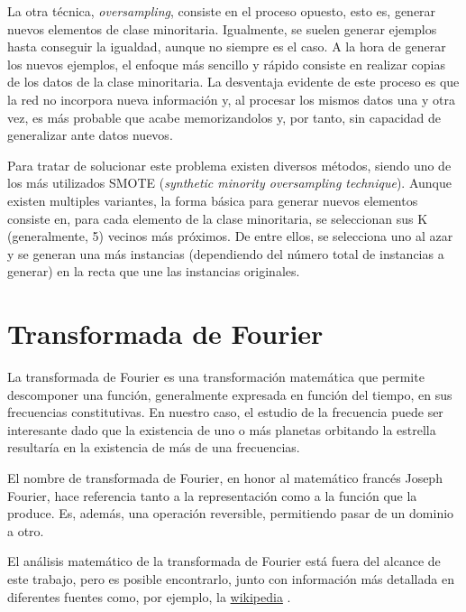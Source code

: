 La otra técnica, \textit{oversampling}, consiste en el proceso opuesto, esto es, generar nuevos elementos de clase minoritaria. Igualmente, se suelen generar ejemplos hasta conseguir la igualdad, aunque no siempre es el caso. A la hora de generar los nuevos ejemplos, el enfoque más sencillo y rápido consiste en realizar copias de los datos de la clase minoritaria. La desventaja evidente de este proceso es que la red no incorpora nueva información y, al procesar los mismos datos una y otra vez, es más probable que acabe memorizandolos y, por tanto, sin capacidad de generalizar ante datos nuevos.

Para tratar de solucionar este problema existen diversos métodos, siendo uno de los más utilizados SMOTE \cite{SMOTE} (\textit{synthetic minority oversampling technique}). Aunque existen multiples variantes, la forma básica para generar nuevos elementos consiste en, para cada elemento de la clase minoritaria, se seleccionan sus K (generalmente, 5) vecinos más próximos. De entre ellos, se selecciona uno al azar y se generan una más instancias (dependiendo del número total de instancias a generar) en la recta que une las instancias originales.

\section{Transformada de Fourier}
La transformada de Fourier es una transformación matemática que permite descomponer una función, generalmente expresada en función del tiempo, en sus frecuencias constitutivas. En nuestro caso, el estudio de la frecuencia puede ser interesante dado que la existencia de uno o más planetas orbitando la estrella resultaría en la existencia de más de una frecuencias.


El nombre de transformada de Fourier, en honor al matemático francés Joseph Fourier, hace referencia tanto a la representación como a la función que la produce. Es, además, una operación reversible, permitiendo pasar de un dominio a otro. 

El análisis matemático de la transformada de Fourier está fuera del alcance de este trabajo, pero es posible encontrarlo, junto con información más detallada en diferentes fuentes como, por ejemplo, la \href{https://es.wikipedia.org/wiki/Transformada_de_Fourier}{wikipedia} \cite{Wikipedia-fourier}.

